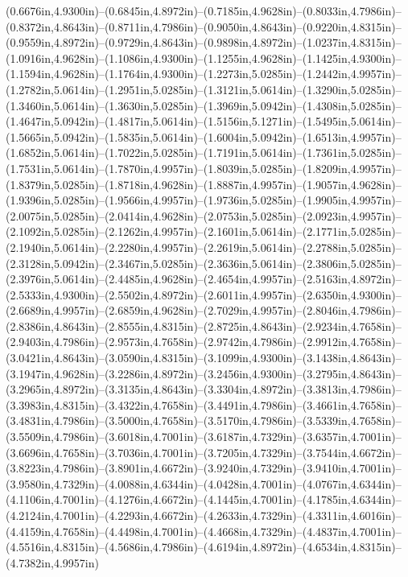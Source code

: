 (0.6676in,4.9300in)--(0.6845in,4.8972in)--(0.7185in,4.9628in)--(0.8033in,4.7986in)--(0.8372in,4.8643in)--(0.8711in,4.7986in)--(0.9050in,4.8643in)--(0.9220in,4.8315in)--(0.9559in,4.8972in)--(0.9729in,4.8643in)--(0.9898in,4.8972in)--(1.0237in,4.8315in)--(1.0916in,4.9628in)--(1.1086in,4.9300in)--(1.1255in,4.9628in)--(1.1425in,4.9300in)--(1.1594in,4.9628in)--(1.1764in,4.9300in)--(1.2273in,5.0285in)--(1.2442in,4.9957in)--(1.2782in,5.0614in)--(1.2951in,5.0285in)--(1.3121in,5.0614in)--(1.3290in,5.0285in)--(1.3460in,5.0614in)--(1.3630in,5.0285in)--(1.3969in,5.0942in)--(1.4308in,5.0285in)--(1.4647in,5.0942in)--(1.4817in,5.0614in)--(1.5156in,5.1271in)--(1.5495in,5.0614in)--(1.5665in,5.0942in)--(1.5835in,5.0614in)--(1.6004in,5.0942in)--(1.6513in,4.9957in)--(1.6852in,5.0614in)--(1.7022in,5.0285in)--(1.7191in,5.0614in)--(1.7361in,5.0285in)--(1.7531in,5.0614in)--(1.7870in,4.9957in)--(1.8039in,5.0285in)--(1.8209in,4.9957in)--(1.8379in,5.0285in)--(1.8718in,4.9628in)--(1.8887in,4.9957in)--(1.9057in,4.9628in)--(1.9396in,5.0285in)--(1.9566in,4.9957in)--(1.9736in,5.0285in)--(1.9905in,4.9957in)--(2.0075in,5.0285in)--(2.0414in,4.9628in)--(2.0753in,5.0285in)--(2.0923in,4.9957in)--(2.1092in,5.0285in)--(2.1262in,4.9957in)--(2.1601in,5.0614in)--(2.1771in,5.0285in)--(2.1940in,5.0614in)--(2.2280in,4.9957in)--(2.2619in,5.0614in)--(2.2788in,5.0285in)--(2.3128in,5.0942in)--(2.3467in,5.0285in)--(2.3636in,5.0614in)--(2.3806in,5.0285in)--(2.3976in,5.0614in)--(2.4485in,4.9628in)--(2.4654in,4.9957in)--(2.5163in,4.8972in)--(2.5333in,4.9300in)--(2.5502in,4.8972in)--(2.6011in,4.9957in)--(2.6350in,4.9300in)--(2.6689in,4.9957in)--(2.6859in,4.9628in)--(2.7029in,4.9957in)--(2.8046in,4.7986in)--(2.8386in,4.8643in)--(2.8555in,4.8315in)--(2.8725in,4.8643in)--(2.9234in,4.7658in)--(2.9403in,4.7986in)--(2.9573in,4.7658in)--(2.9742in,4.7986in)--(2.9912in,4.7658in)--(3.0421in,4.8643in)--(3.0590in,4.8315in)--(3.1099in,4.9300in)--(3.1438in,4.8643in)--(3.1947in,4.9628in)--(3.2286in,4.8972in)--(3.2456in,4.9300in)--(3.2795in,4.8643in)--(3.2965in,4.8972in)--(3.3135in,4.8643in)--(3.3304in,4.8972in)--(3.3813in,4.7986in)--(3.3983in,4.8315in)--(3.4322in,4.7658in)--(3.4491in,4.7986in)--(3.4661in,4.7658in)--(3.4831in,4.7986in)--(3.5000in,4.7658in)--(3.5170in,4.7986in)--(3.5339in,4.7658in)--(3.5509in,4.7986in)--(3.6018in,4.7001in)--(3.6187in,4.7329in)--(3.6357in,4.7001in)--(3.6696in,4.7658in)--(3.7036in,4.7001in)--(3.7205in,4.7329in)--(3.7544in,4.6672in)--(3.8223in,4.7986in)--(3.8901in,4.6672in)--(3.9240in,4.7329in)--(3.9410in,4.7001in)--(3.9580in,4.7329in)--(4.0088in,4.6344in)--(4.0428in,4.7001in)--(4.0767in,4.6344in)--(4.1106in,4.7001in)--(4.1276in,4.6672in)--(4.1445in,4.7001in)--(4.1785in,4.6344in)--(4.2124in,4.7001in)--(4.2293in,4.6672in)--(4.2633in,4.7329in)--(4.3311in,4.6016in)--(4.4159in,4.7658in)--(4.4498in,4.7001in)--(4.4668in,4.7329in)--(4.4837in,4.7001in)--(4.5516in,4.8315in)--(4.5686in,4.7986in)--(4.6194in,4.8972in)--(4.6534in,4.8315in)--(4.7382in,4.9957in) 
